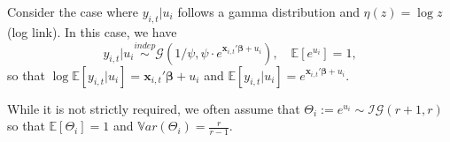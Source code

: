 \documentclass[ignorenonframetext,]{beamer}
\begin{document}
\begin{frame}[allowframebreaks]
\framebreak

\begin{example}
Consider the case where $y_{i,t}|u_i$ follows a gamma distribution and $\eta(z)=\log z$ (log link). In this case, we have
$$
y_{i,t}|u_i \overset{indep}\sim \mathcal{G}(1/\psi, \psi \cdot e^{\mathbf{x}_{i,t}'\bm{\beta} + u_i}), \quad \mathbb{E}[e^{u_i}]=1,
$$
so that $\log \mathbb{E}[y_{i,t}|u_i] = \mathbf{x}_{i,t}'\bm{\beta} + u_i$ and $\mathbb{E}[y_{i,t}|u_i] = e^{\mathbf{x}_{i,t}'\bm{\beta} + u_i}$.

While it is not strictly required, we often assume that $\Theta_i := e^{u_i} \sim \mathcal{IG}(r+1, r)$ so that $\mathbb{E}[\Theta_i]=1$ and $\mathbb{V}ar(\Theta_i) = \frac{r}{r-1}$.
\end{example}

\end{frame}
\end{document}
